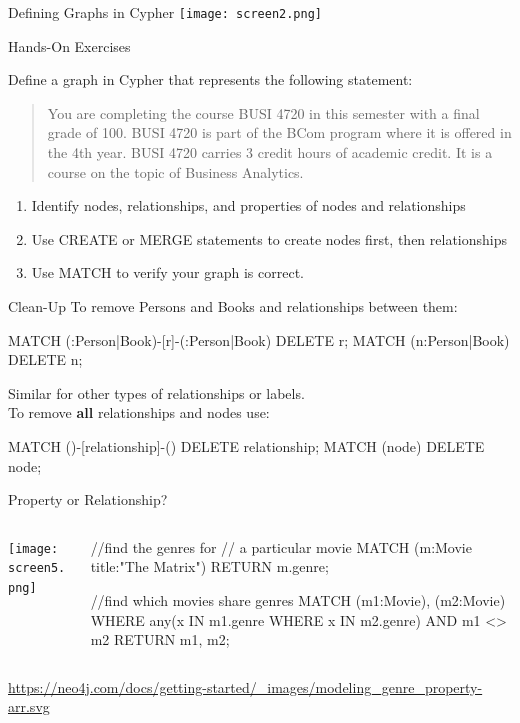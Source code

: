 \documentclass[ignorenonframetext,xcolor=x11names]{beamer}
\begin{document}
\begin{frame}{Defining Graphs in Cypher}
\texttt{[image: screen2.png]}
\end{frame}

\begin{frame}{Hands-On Exercises}

Define a graph in Cypher that represents the following statement:\\

\begin{quote}
You are completing the course BUSI 4720 in this semester with a final grade of 100. BUSI 4720 is part of the BCom program where it is offered in the 4th year. BUSI 4720 carries 3 credit hours of academic credit. It is a course on the topic of Business Analytics. 
\end{quote}

\begin{enumerate}
  \item Identify nodes, relationships, and properties of nodes and relationships
  \item Use CREATE or MERGE statements to create nodes first, then relationships
  \item Use MATCH to verify your graph is correct.
\end{enumerate}
\end{frame}

\begin{frame}[fragile]{Clean-Up}
To remove Persons and Books and relationships between them:
\footnotesize
\begin{cyphercode}
MATCH (:Person|Book)-[r]-(:Person|Book) DELETE r;
MATCH (n:Person|Book) DELETE n;
\end{cyphercode}
\normalsize
Similar for other types of relationships or labels. \\

To remove \textbf{all} relationships and nodes use:
\footnotesize
\begin{cyphercode}
MATCH ()-[relationship]-() DELETE relationship;
MATCH (node) DELETE node;
\end{cyphercode}
\normalsize
\end{frame}

\begin{frame}[fragile]{Property or Relationship?}
\begin{columns}
\begin{column}{.35\textwidth}
\texttt{[image: screen5.png]}
\end{column}
\begin{column}{.65\textwidth}
\scriptsize
\begin{cyphercode}
//find the genres for 
// a particular movie
MATCH (m:Movie {title:"The Matrix"})
RETURN m.genre;

//find which movies share genres
MATCH (m1:Movie), (m2:Movie)
WHERE any(x IN m1.genre 
          WHERE x IN m2.genre)
AND m1 <> m2
RETURN m1, m2;
\end{cyphercode}
\end{column}
\end{columns}
\tiny{\url{https://neo4j.com/docs/getting-started/\_images/modeling\_genre\_property-arr.svg}}
\end{frame}
\end{document}
